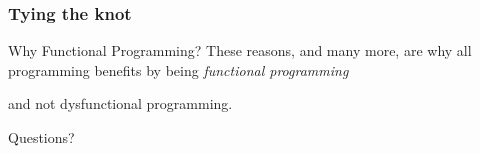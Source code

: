 \begin{frame}
\frametitle{Tying the knot}
\begin{block}{Why Functional Programming?}
These reasons, and many more, are why all programming benefits by being \emph{functional programming}
\end{block}
\tiny{and not dysfunctional programming}.
\normalsize
\begin{center}
Questions?
\end{center}
\end{frame}

